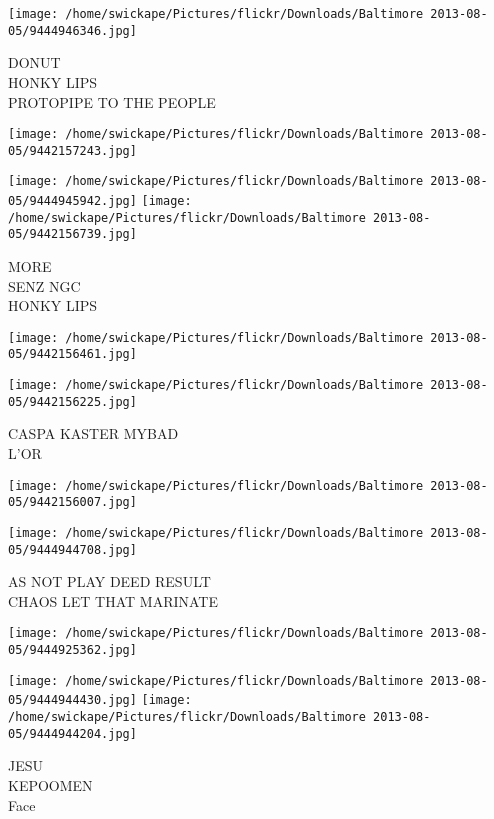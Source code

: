 \documentclass[10pt,letterpaper]{article}
\begin{document}
\texttt{[image: /home/swickape/Pictures/flickr/Downloads/Baltimore 2013-08-05/9444946346.jpg]}

DONUT\\
HONKY LIPS\\
PROTOPIPE TO THE PEOPLE\\
\pagebreak

\texttt{[image: /home/swickape/Pictures/flickr/Downloads/Baltimore 2013-08-05/9442157243.jpg]}

\vspace{0.25in}
\texttt{[image: /home/swickape/Pictures/flickr/Downloads/Baltimore 2013-08-05/9444945942.jpg]}
\texttt{[image: /home/swickape/Pictures/flickr/Downloads/Baltimore 2013-08-05/9442156739.jpg]}

MORE\\
SENZ NGC\\
HONKY LIPS\\
\pagebreak

\texttt{[image: /home/swickape/Pictures/flickr/Downloads/Baltimore 2013-08-05/9442156461.jpg]}

\vspace{0.25in}
\texttt{[image: /home/swickape/Pictures/flickr/Downloads/Baltimore 2013-08-05/9442156225.jpg]}

CASPA KASTER MYBAD\\
L'OR\\
\pagebreak

\texttt{[image: /home/swickape/Pictures/flickr/Downloads/Baltimore 2013-08-05/9442156007.jpg]}

\vspace{0.25in}
\texttt{[image: /home/swickape/Pictures/flickr/Downloads/Baltimore 2013-08-05/9444944708.jpg]}

AS NOT PLAY DEED RESULT\\
CHAOS LET THAT MARINATE\\
\pagebreak

\texttt{[image: /home/swickape/Pictures/flickr/Downloads/Baltimore 2013-08-05/9444925362.jpg]}

\vspace{0.25in}
\texttt{[image: /home/swickape/Pictures/flickr/Downloads/Baltimore 2013-08-05/9444944430.jpg]}
\texttt{[image: /home/swickape/Pictures/flickr/Downloads/Baltimore 2013-08-05/9444944204.jpg]}

JESU\\
KEPOOMEN\\
Face\\
\pagebreak
\end{document}
